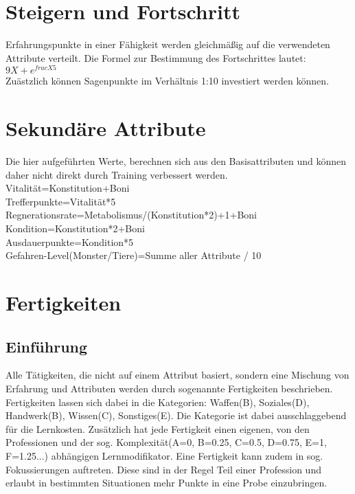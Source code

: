 \documentclass[a4paper,12pt,oneside]{book}
\begin{document}
\chapter{Steigern und Fortschritt}
Erfahrungspunkte in einer Fähigkeit werden gleichmäßig auf die verwendeten Attribute verteilt. Die Formel zur Bestimmung des Fortschrittes lautet:
\\$9X+e^{frac{X}{5}}$
\\Zuästzlich können Sagenpunkte im Verhältnis 1:10 investiert werden können.
\chapter{Sekundäre Attribute}
Die hier aufgeführten Werte, berechnen sich aus den Basisattributen und können daher nicht direkt durch Training verbessert werden.
\\Vitalität=Konstitution+Boni
\\Trefferpunkte=Vitalität*5
\\Regnerationsrate=Metabolismus/(Konstitution*2)+1+Boni
\\Kondition=Konstitution*2+Boni
\\Ausdauerpunkte=Kondition*5
\\Gefahren-Level(Monster/Tiere)=Summe aller Attribute / 10
\chapter{Fertigkeiten}
\section{Einführung}
Alle Tätigkeiten, die nicht auf einem Attribut basiert, sondern eine Mischung von Erfahrung und Attributen werden durch sogenannte Fertigkeiten beschrieben. Fertigkeiten lassen sich dabei in die Kategorien: Waffen(B), Soziales(D), Handwerk(B), Wissen(C), Sonstiges(E). Die Kategorie ist dabei ausschlaggebend für die Lernkosten. Zusätzlich hat jede Fertigkeit einen eigenen, von den Professionen und der sog. Komplexität(A=0, B=0.25, C=0.5, D=0.75, E=1, F=1.25...) abhängigen Lernmodifikator. Eine Fertigkeit kann zudem in sog. Fokussierungen auftreten. Diese sind in der Regel Teil einer Profession und erlaubt in bestimmten Situationen mehr Punkte in eine Probe einzubringen.
\end{document}
